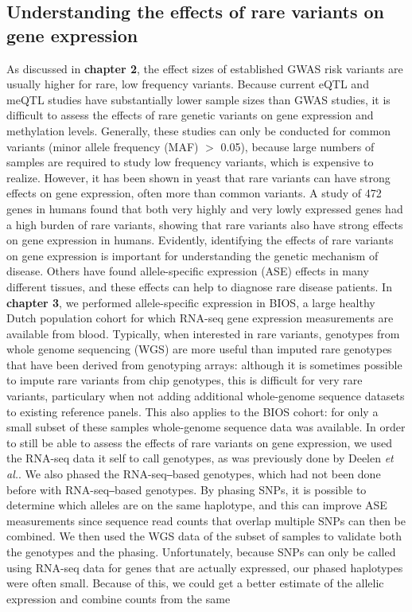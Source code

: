 \subsection{Understanding the effects of rare variants on gene expression}

As discussed in \textbf{chapter 2}, the effect sizes of established GWAS risk variants are usually higher for rare, low frequency variants. Because current eQTL and meQTL studies have substantially lower sample sizes than GWAS studies, it is difficult to assess the effects of rare genetic variants on gene expression and methylation levels. Generally, these studies can only be conducted for common variants (minor allele frequency (MAF) $>$ 0.05), because large numbers of samples are required to study low frequency variants, which is expensive to realize. However, it has been shown in yeast that rare variants can have strong effects on gene expression, often more than common variants\cite{bloomRareVariantsContribute2019}. A study of 472 genes in humans found that both very highly and very lowly expressed genes had a high burden of rare variants\cite{zhaoBurdenRareVariants2016}, showing that rare variants also have strong effects on gene expression in humans. Evidently, identifying the effects of rare variants on gene expression is important for understanding the genetic mechanism of disease. Others have found allele-specific expression (ASE) effects in many different tissues\cite{castelVastResourceAllelic2020}, and these effects can help to diagnose rare disease patients\cite{mohammadiGeneticRegulatoryVariation2019}. In \textbf{chapter 3}, we performed allele-specific expression in BIOS, a large healthy Dutch population cohort for which RNA-seq gene expression measurements are available from blood. Typically, when interested in rare variants, genotypes from whole genome sequencing (WGS) are more useful than imputed rare genotypes that have been derived from genotyping arrays: although it is sometimes possible to impute rare variants from chip genotypes, this is difficult for very rare variants, particulary when  not adding additional whole-genome sequence datasets to existing reference panels\cite{hoffmannStrategiesImputingAnalyzing2015}. This also applies to the BIOS cohort: for only a small subset of these samples whole-genome sequence data was available. In order to still be able to assess the effects of rare variants on gene expression, we used the RNA-seq data it self to call genotypes, as was previously done by Deelen \textit{et al.}\cite{deelenCallingGenotypesPublic2015}. We also phased the RNA-seq‒based genotypes, which had not been done before with RNA-seq‒based genotypes. By phasing SNPs, it is possible to determine which alleles are on the same haplotype, and this can improve ASE measurements since sequence read counts that overlap multiple SNPs can then be combined. We then used the WGS data of the subset of samples to validate both the genotypes and the phasing. Unfortunately, because SNPs can only be called using RNA-seq data for genes that are actually expressed, our phased haplotypes were often small. Because of this, we could get a better estimate of the allelic expression and combine counts from the same 